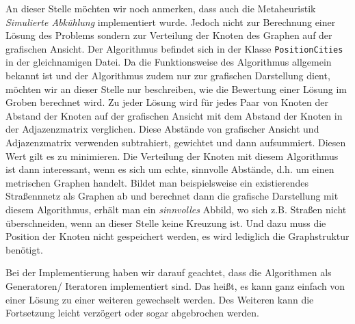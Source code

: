 An dieser Stelle möchten wir noch anmerken, dass auch die Metaheuristik \emph{Simulierte Abkühlung} implementiert wurde. Jedoch nicht zur Berechnung einer Lösung des Problems sondern zur Verteilung der Knoten des Graphen auf der grafischen Ansicht. Der Algorithmus befindet sich in der Klasse \texttt{PositionCities} in der gleichnamigen Datei. Da die Funktionsweise des Algorithmus allgemein bekannt ist und der Algorithmus zudem nur zur grafischen Darstellung dient, möchten wir an dieser Stelle nur beschreiben, wie die Bewertung einer Lösung im Groben berechnet wird. Zu jeder Lösung wird für jedes Paar von Knoten der Abstand der Knoten auf der grafischen Ansicht mit dem Abstand der Knoten in der Adjazenzmatrix verglichen. Diese Abstände von grafischer Ansicht und Adjazenzmatrix verwenden subtrahiert, gewichtet und dann aufsummiert. Diesen Wert gilt es zu minimieren. Die Verteilung der Knoten mit diesem Algorithmus ist dann interessant, wenn es sich um echte, sinnvolle Abstände, d.h. um einen metrischen Graphen handelt. Bildet man beispielsweise ein existierendes Straßennnetz als Graphen ab und berechnet dann die grafische Darstellung mit diesem Algorithmus, erhält man ein \emph{sinnvolles} Abbild, wo sich z.B. Straßen nicht überschneiden, wenn an dieser Stelle keine Kreuzung ist. Und dazu muss die Position der Knoten nicht gespeichert werden, es wird lediglich die Graphstruktur benötigt.

Bei der Implementierung haben wir darauf geachtet, dass die Algorithmen als Generatoren/ Iteratoren implementiert sind. Das heißt, es kann ganz einfach von einer Lösung zu einer weiteren gewechselt werden. Des Weiteren kann die Fortsetzung leicht verzögert oder sogar abgebrochen werden.


